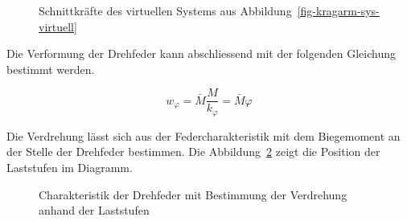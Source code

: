 \documentclass[
  11pt,
  letterpaper,
]{scrreprt}
\begin{document}
\begin{figure}[H]


\caption{\label{fig-sk-kragarm-virtuell}Schnittkräfte des virtuellen
Systems aus Abbildung~\ref{fig-kragarm-sys-virtuell}}

\end{figure}%

Die Verformung der Drehfeder kann abschliessend mit der folgenden
Gleichung bestimmt werden.

\[
w_{\varphi} = \bar{M} \frac{M}{k_\varphi} = \bar{M} \varphi
\]

Die Verdrehung lässt sich aus der Federcharakteristik mit dem
Biegemoment an der Stelle der Drehfeder bestimmen. Die
Abbildung~\ref{fig-feder-force} zeigt die Position der Laststufen im
Diagramm.

\begin{figure}[H]


\caption{\label{fig-feder-force}Charakteristik der Drehfeder mit
Bestimmung der Verdrehung anhand der Laststufen}

\end{figure}%
\end{document}
